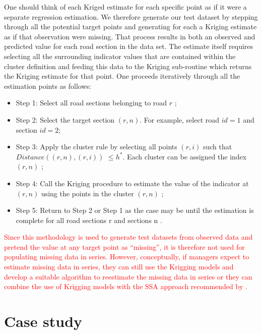 \documentclass[Journal]{ascelike}
\begin{document}
One should think of each Kriged estimate for each specific point as if it were a separate
regression estimation. We therefore generate our test dataset by stepping through all the
potential target points and generating for each a Kriging estimate as if that observation were
missing. That process results in both an observed and predicted value for each road section in
the data set. The estimate itself requires selecting all the surrounding indicator values that are
contained within the cluster definition and feeding this data to the Kriging sub-routine which
returns the Kriging estimate for that point. One proceeds iteratively through all the estimation points as
follows:
%
\begin{itemize}
 \item Step 1: Select all road sections belonging to road $r$ ;
\item Step 2: Select the target section $(r,n)$. For example, select road $id=1$ and section $id=2$;
\item Step 3: Apply the cluster rule by selecting all points $(r,i)$ such that $Distance((r,n),(r,i))$ $\le h^*$. Each 
cluster can be assigned the index $(r,n)$ ;
\item Step 4: Call the Kriging procedure to estimate the value of the indicator at $(r,n)$ using the points in the cluster $(r,n)$ ;
\item Step 5: Return to Step 2 or Step 1 as the case may be until the estimation is complete for all road sections r and 
sections n .
\end{itemize}

\textcolor{red}{Since this methodology is used to generate test datasets from observed data and pretend the value at any target point as ``missing'', it is therefore not used for populating missing data in series. However, conceptually, if managers expect to estimate missing data in series, they can still use the Krigging models and develop a suitable algorithm to reestimate the missing data in series or they can combine the use of Krigging models with the SSA approach recommended by .} 

%
\section{Case study} \label{casestudy}
\end{document}
